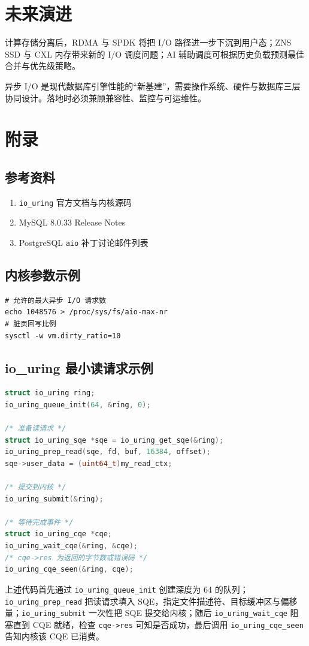 \chapter{未来演进}
计算存储分离后，RDMA 与 SPDK 将把 I/O 路径进一步下沉到用户态；ZNS SSD 与 CXL 内存带来新的 I/O 调度问题；AI 辅助调度可根据历史负载预测最佳合并与优先级策略。\par
异步 I/O 是现代数据库引擎性能的“新基建”，需要操作系统、硬件与数据库三层协同设计。落地时必须兼顾兼容性、监控与可运维性。\par
\chapter{附录}
\section{参考资料}
\begin{enumerate}
\item \texttt{io\_{}uring} 官方文档与内核源码
\item MySQL 8.0.33 Release Notes
\item PostgreSQL \texttt{aio} 补丁讨论邮件列表
\end{enumerate}
\section{内核参数示例}
\begin{lstlisting}[language=shell]
# 允许的最大异步 I/O 请求数
echo 1048576 > /proc/sys/fs/aio-max-nr
# 脏页回写比例
sysctl -w vm.dirty_ratio=10
\end{lstlisting}
\section{io\_{}uring 最小读请求示例}
\begin{lstlisting}[language=c]
struct io_uring ring;
io_uring_queue_init(64, &ring, 0);

/* 准备读请求 */
struct io_uring_sqe *sqe = io_uring_get_sqe(&ring);
io_uring_prep_read(sqe, fd, buf, 16384, offset);
sqe->user_data = (uint64_t)my_read_ctx;

/* 提交到内核 */
io_uring_submit(&ring);

/* 等待完成事件 */
struct io_uring_cqe *cqe;
io_uring_wait_cqe(&ring, &cqe);
/* cqe->res 为返回的字节数或错误码 */
io_uring_cqe_seen(&ring, cqe);
\end{lstlisting}
上述代码首先通过 \texttt{io\_{}uring\_{}queue\_{}init} 创建深度为 64 的队列；\texttt{io\_{}uring\_{}prep\_{}read} 把读请求填入 SQE，指定文件描述符、目标缓冲区与偏移量；\texttt{io\_{}uring\_{}submit} 一次性把 SQE 提交给内核；随后 \texttt{io\_{}uring\_{}wait\_{}cqe} 阻塞直到 CQE 就绪，检查 \texttt{cqe->res} 可知是否成功，最后调用 \texttt{io\_{}uring\_{}cqe\_{}seen} 告知内核该 CQE 已消费。\par
